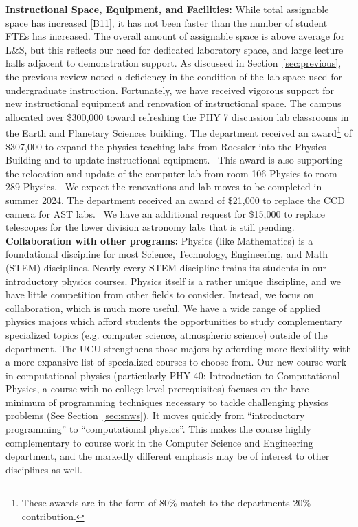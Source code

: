 \documentclass[12pt]{article}
\begin{document}
\noindent
{\bf Instructional Space, Equipment, and Facilities:} While total
assignable space has increased [B11], it has not been faster than the
number of student FTEs has increased.  The overall amount of assignable
space is above average for L\&S, but this reflects our need for
dedicated laboratory space, and large lecture halls adjacent to
demonstration support.  As discussed in Section~\ref{sec:previous},
the previous review noted a deficiency in the condition of the lab
space used for undergraduate instruction.  Fortunately, we have
received vigorous support for new instructional equipment and renovation of instructional space.  The campus allocated over \$300,000 toward refreshing the PHY 7 discussion lab classrooms in the Earth and Planetary Sciences building.  The department received an award\footnote{These awards are in the form of 80\% match to the departments 20\% contribution.} of \$307,000 to expand the physics teaching labs from Roessler into the Physics Building and to update instructional equipment.  This award is also supporting the relocation and update of the computer lab from room 106 Physics to room 289 Physics.  We expect the renovations and lab moves to be completed in summer 2024.  The department received an award of \$21,000 to replace the CCD camera for AST labs.  We have an additional request for \$15,000 to replace telescopes for the lower division astronomy labs that is still pending.\\[3pt]

\noindent
{\bf Collaboration with other programs: } Physics (like Mathematics)
is a foundational discipline for most Science, Technology,
Engineering, and Math (STEM) disciplines.  Nearly every STEM
discipline trains its students in our introductory physics courses.
Physics itself is a rather unique discipline, and we have little
competition from other fields to consider.  Instead, we focus on
collaboration, which is much more useful.  We have a wide range of
applied physics majors which afford students the opportunities to
study complementary specialized topics (e.g. computer science,
atmospheric science) outside of the department.  The UCU strengthens
those majors by affording more flexibility with a more expansive list
of specialized courses to choose from.  Our new course work in
computational physics (particularly PHY 40: Introduction to
Computational Physics, a course with no college-level prerequisites)
focuses on the bare minimum of programming techniques necessary to
tackle challenging physics problems (See Section~\ref{sec:snws}).  It
moves quickly from ``introductory programming'' to ``computational
physics''.  This makes the course highly complementary to course work
in the Computer Science and Engineering department, and the markedly
different emphasis may be of interest to other disciplines as
well.\\[3pt]
\end{document}
